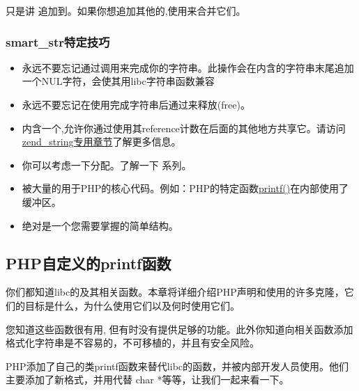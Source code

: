 只是讲 追加到。如果你想追加其他的,使用来合并它们。

\subsubsection{smart\_str特定技巧}

\begin{itemize}
        \item 永远不要忘记通过调用来完成你的字符串。此操作会在内含的字符串末尾追加一个NUL字符，会使其用libc字符串函数兼容
        \item 永远不要忘记在使用完成字符串后通过来释放(free)。
        \item {}内含一个,允许你通过使用其reference计数在后面的其他地方共享它。请访问\href{http://www.phpinternalsbook.com/php7/internal_types/strings/zend_strings.html}{zend\_string专用章节}了解更多信息。
        \item 你可以考虑一下分配。了解一下 系列。
        \item {}被大量的用于PHP的核心代码。例如：PHP的特定函数\href{http://www.phpinternalsbook.com/php7/internal_types/strings/printing_functions.html}{printf()}在内部使用了缓冲区。
        \item {}绝对是一个您需要掌握的简单结构。
\end{itemize}  


\subsection{PHP自定义的printf函数}

你们都知道libc的及其相关函数。本章将详细介绍PHP声明和使用的许多克隆，它们的目标是什么，为什么使用它们以及何时使用它们。



您知道这些函数很有用, 但有时没有提供足够的功能。此外你知道向相关函数添加格式化字符串是不容易的，不可移植的，并且有安全风险。

PHP添加了自己的类printf函数来替代libc的函数，并被内部开发人员使用。他们主要添加了新格式，并用代替 char *等等，让我们一起来看一下。

